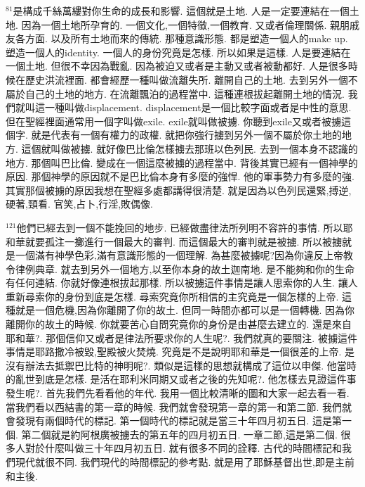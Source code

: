 \documentclass{book}
\begin{document}
$^{81}$是構成千絲萬縷對你生命的成長和影響.
這個就是土地.
人是一定要連結在一個土地.
因為一個土地所孕育的.
一個文化,一個特徵,一個教育.
又或者倫理關係.
親朋戚友各方面.
以及所有土地而來的傳統.
那種意識形態.
都是塑造一個人的make up.
塑造一個人的identity.
一個人的身份究竟是怎樣.
所以如果是這樣.
人是要連結在一個土地.
但很不幸因為戰亂.
因為被迫又或者是主動又或者被動都好.
人是很多時候在歷史洪流裡面.
都會經歷一種叫做流離失所.
離開自己的土地.
去到另外一個不屬於自己的土地的地方.
在流離飄泊的過程當中.
這種連根拔起離開土地的情況.
我們就叫這一種叫做displacement.
displacement是一個比較字面或者是中性的意思.
但在聖經裡面通常用一個字叫做exile.
exile就叫做被擄.
你聽到exile又或者被擄這個字.
就是代表有一個有權力的政權.
就把你強行擄到另外一個不屬於你土地的地方.
這個就叫做被擄.
就好像巴比倫怎樣擄去那班以色列民.
去到一個本身不認識的地方.
那個叫巴比倫.
變成在一個這麼被擄的過程當中.
背後其實已經有一個神學的原因.
那個神學的原因就不是巴比倫本身有多麼的強悍.
他的軍事勢力有多麼的強.
其實那個被擄的原因我想在聖經多處都講得很清楚.
就是因為以色列民還緊,搏逆,硬著,頸看.
官笑,占卜,行淫,敗偶像.

$^{121}$他們已經去到一個不能挽回的地步.
已經做盡律法所列明不容許的事情.
所以耶和華就要孤注一擲進行一個最大的審判.
而這個最大的審判就是被擄.
所以被擄就是一個滿有神學色彩,滿有意識形態的一個理解.
為甚麼被擄呢?因為你違反上帝教令律例典章.
就去到另外一個地方,以至你本身的故土迦南地.
是不能夠和你的生命有任何連結.
你就好像連根拔起那樣.
所以被擄這件事情是讓人思索你的人生.
讓人重新尋索你的身份到底是怎樣.
尋索究竟你所相信的主究竟是一個怎樣的上帝.
這種就是一個危機,因為你離開了你的故土.
但同一時間亦都可以是一個轉機.
因為你離開你的故土的時候.
你就要苦心自問究竟你的身份是由甚麼去建立的.
還是來自耶和華?.
那個信仰又或者是律法所要求你的人生呢?.
我們就真的要關注.
被擄這件事情是耶路撒冷被毀,聖殿被火焚燒.
究竟是不是說明耶和華是一個很差的上帝.
是沒有辦法去抵禦巴比特的神明呢?.
類似是這樣的思想就構成了這位以申傑.
他當時的亂世到底是怎樣.
是活在耶利米同期又或者之後的先知呢?.
他怎樣去見證這件事發生呢?.
首先我們先看看他的年代.
我用一個比較清晰的圖和大家一起去看一看.
當我們看以西結書的第一章的時候.
我們就會發現第一章的第一和第二節.
我們就會發現有兩個時代的標記.
第一個時代的標記就是當三十年四月初五日.
這是第一個.
第二個就是約阿根廣被擄去的第五年的四月初五日.
一章二節,這是第二個.
很多人對於什麼叫做三十年四月初五日.
就有很多不同的詮釋.
古代的時間標記和我們現代就很不同.
我們現代的時間標記的參考點.
就是用了耶穌基督出世,即是主前和主後.
\end{document}
